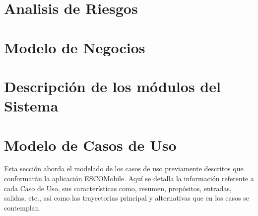 \documentclass[oneside,10pt]{book}
\begin{document}


\chapter{Analisis de Riesgos}


\chapter{Modelo de Negocios}


\chapter{Descripción de los módulos del Sistema}

\chapter{Modelo de Casos de Uso}
\noindent
Esta sección aborda el modelado de los casos de uso previamente descritos que conformarán la aplicación ESCOMobile. Aquí se detalla la información referente a cada Caso de Uso, sus características como, resumen, propósitos, entradas, salidas, etc., así como las trayectorias principal y alternativas que en los casos se contemplan. 


\end{document}
